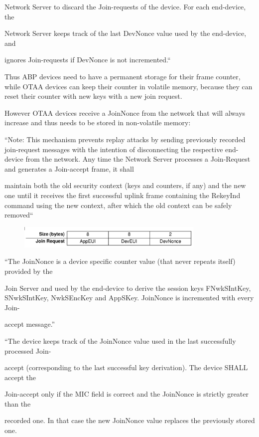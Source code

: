 {{Network Server to discard the Join-requests of the device. For each
end-device, the}

{Network Server keeps track of the last DevNonce value used by the
end-device, and}

{ignores Join-requests if DevNonce is not incremented.``}

{Thus ABP devices need to have a permanent storage for their frame
counter, while OTAA devices can keep their counter in volatile memory,
because they can reset their counter with new keys with a new join
request.}

{However OTAA devices receive a JoinNonce from the network that will
always increase and thus needs to be stored in non-volatile memory:}

{``Note: This mechanism prevents replay attacks by sending previously
recorded join-request messages with the intention of disconnecting the
respective end-device from the network. Any time the Network Server
processes a Join-Request and generates a Join-accept frame, it shall}

{maintain both the old security context (keys and counters, if any) and
the new one until it receives the first successful uplink frame
containing the RekeyInd command using the new context, after which the
old context can be safely removed``}

\begin{figure}[h!]
{\includegraphics[width=0.8\textwidth]{images/image16.png}}
\end{figure}

{``The JoinNonce is a device specific counter value (that never repeats
itself) provided by the}

{Join Server and used by the end-device to derive the session keys
FNwkSIntKey, SNwkSIntKey, NwkSEncKey and AppSKey. JoinNonce is
incremented with every Join-}

{accept message.''}

{``The device keeps track of the JoinNonce value used in the last
successfully processed Join-}

{accept (corresponding to the last successful key derivation). The
device SHALL accept the}

{Join-accept only if the MIC field is correct and the JoinNonce is
strictly greater than the}

{recorded one. In that case the new JoinNonce value replaces the
previously stored one.}

}

